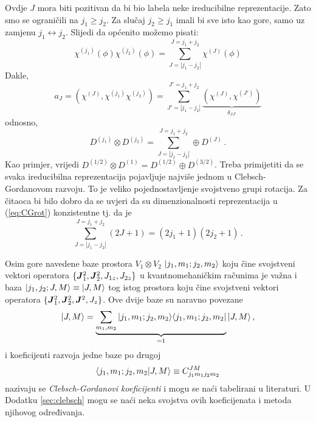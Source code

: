 Ovdje $J$ mora biti pozitivan da bi bio labela neke ireducibilne
reprezentacije. Zato smo se ograničili na $j_1\ge j_2$.
Za slučaj $j_2 \ge j_1$ imali bi sve isto kao gore, samo uz zamjenu $j_1 \leftrightarrow
j_2$. Slijedi da općenito možemo pisati:
\begin{equation}
 \chi^{(j_1)}(\phi)\chi^{(j_2)}(\phi)=
\sum_{J=|j_1-j_2|}^{J=j_1+j_2} \chi^{(J)}(\phi)
\end{equation}
Dakle,
\begin{equation}
 a_J = \left(\chi^{(J)}, \chi^{(j_1)}\chi^{(j_2)}\right) =
 \sum_{J'=|j_1-j_2|}^{J'=j_1+j_2} 
\underbrace{\left(\chi^{(J)}, \chi^{(J')}\right)}_{\delta_{JJ'}}
\end{equation}
odnosno,
\begin{equation}
D^{(j_1)} \otimes D^{(j_2)} = \sum_{J=|j_1-j_2|}^{J=j_1+j_2} 
\oplus D^{(J)} \,. \label{eq:CGrot}
\end{equation}
Kao primjer, vrijedi $D^{(1/2)}\otimes D^{(1)} = D^{(1/2)} \oplus D^{(3/2)}$.
Treba primijetiti da se svaka ireducibilna reprezentacija pojavljuje najviše jednom
u  Clebsch-Gordanovom razvoju. To je veliko pojednostavljenje svojstveno grupi rotacija.
Za čitaoca bi bilo dobro da se uvjeri da su dimenzionalnosti reprezentacija
u (\ref{eq:CGrot}) konzistentne tj. da je
\begin{displaymath}
    \sum_{J=|j_1-j_2|}^{J=j_1+j_2} (2J+1) = (2j_1+1)(2j_2+1) \,.
\end{displaymath}

Osim gore navedene baze prostora $V_1 \otimes V_2$
$| j_1, m_1; j_2, m_2 \rangle$ koju čine
svojstveni vektori operatora $\{\jsqj, \jsqd, J_{1z}, J_{2z}\}$ u kvantnomehaničkim
računima je važna i baza $| j_1, j_2; J, M \rangle\equiv| J, M \rangle$
tog istog prostora koju čine svojstveni vektori operatora
$\{\jsqj, \jsqd, \jsq, J_z\}$.
Ove dvije baze su naravno povezane
\begin{equation}
| J, M \rangle = \underbrace{\sum_{m_1,m_2}| j_1, m_1; j_2, m_2 \rangle
\langle j_1, m_1; j_2, m_2 |}_{=1}
| J, M \rangle \,,
\end{equation}
i koeficijenti razvoja jedne baze po drugoj
\begin{equation}
 \langle j_1, m_1; j_2, m_2 | J, M\rangle \equiv C^{JM}_{j_1m_1j_2m_2}
 \label{eq:defCG}
\end{equation}
nazivaju se \emph{Clebsch-Gordanovi koeficijenti} i mogu se naći tabelirani
    u literaturi. U Dodatku \ref{sec:clebsch} mogu se naći neka svojstva
ovih koeficijenata i metoda njihovog određivanja.


